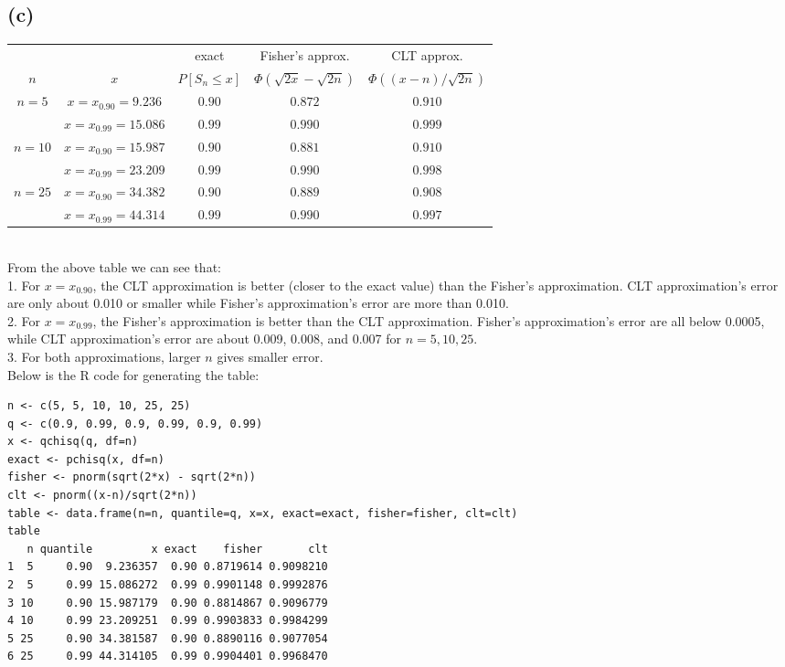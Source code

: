\subsection*{(c)}
\begin{tabular}{|c|c|c|c|c|}
\hline
& & exact & Fisher's approx. & CLT approx.\\
$n$ & $x$ & $P[S_n \leq x]$ & $\Phi(\sqrt{2x}-\sqrt{2n})$ & $\Phi((x-n)/\sqrt{2n})$ \\
\hline
$n=5$ & $x=x_{0.90}=9.236$ & $0.90$ & $0.872$ & $0.910$ \\
\cline{2-5}
& $x=x_{0.99}=15.086$ & $0.99$ & $0.990$ & $0.999$ \\
\hline
$n=10$ & $x=x_{0.90}=15.987$ & $0.90$ & $0.881$ & $0.910$ \\
\cline{2-5}
& $x=x_{0.99}=23.209$ & $0.99$ & $0.990$ & $0.998$ \\
\hline
$n=25$ & $x=x_{0.90}=34.382$ & $0.90$ & $0.889$ & $0.908$ \\
\cline{2-5}
& $x=x_{0.99}=44.314$ & $0.99$ & $0.990$ & $0.997$ \\
\hline
\end{tabular}
\\
From the above table we can see that: \\
1. For $x=x_{0.90}$, the CLT approximation is better (closer to the exact value) than the Fisher's approximation. CLT approximation's error are only about 0.010 or smaller while Fisher's approximation's error are more than 0.010. \\
2. For $x=x_{0.99}$, the Fisher's approximation is better than the CLT approximation. Fisher's approximation's error are all below 0.0005, while CLT approximation's error are about 0.009, 0.008, and 0.007 for $n=5, 10, 25$. \\
3. For both approximations, larger $n$ gives smaller error.\\
Below is the R code for generating the table:
\begin{lstlisting}
n <- c(5, 5, 10, 10, 25, 25)
q <- c(0.9, 0.99, 0.9, 0.99, 0.9, 0.99)
x <- qchisq(q, df=n)
exact <- pchisq(x, df=n)
fisher <- pnorm(sqrt(2*x) - sqrt(2*n))
clt <- pnorm((x-n)/sqrt(2*n))
table <- data.frame(n=n, quantile=q, x=x, exact=exact, fisher=fisher, clt=clt)
table
   n quantile         x exact    fisher       clt
1  5     0.90  9.236357  0.90 0.8719614 0.9098210
2  5     0.99 15.086272  0.99 0.9901148 0.9992876
3 10     0.90 15.987179  0.90 0.8814867 0.9096779
4 10     0.99 23.209251  0.99 0.9903833 0.9984299
5 25     0.90 34.381587  0.90 0.8890116 0.9077054
6 25     0.99 44.314105  0.99 0.9904401 0.9968470
\end{lstlisting}


